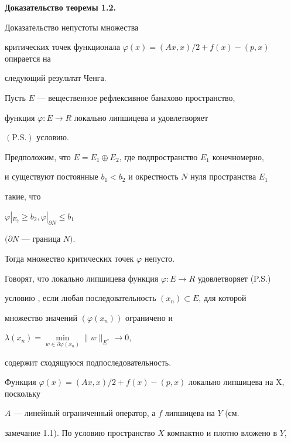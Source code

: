\medskip





{\bf Доказательство теоремы 1.2.}


Доказательство непустоты множества


критических точек функционала $\varphi(x)=(Ax,x)/2+f(x)-(p,x)$ опирается на


следующий результат Ченга.





\begin{thms}


Пусть $E$ --- вещественное рефлексивное банахово пространство,


функция $\varphi :E\to R$ локально липшицева и удовлетворяет


$\mathrm{(P.S.)}$ условию.


Предположим, что $E=E_1\oplus E_2$, где подпространство $E_1$ конечномерно,


и существуют постоянные $b_1<b_2$ и окрестность $N$ нуля пространства $E_1$


такие, что


$\varphi|_{E_2}\ge b_2,\varphi|_{\partial N}\le b_1$


$(\partial N$ --- граница $N)$.


Тогда множество критических точек $\varphi$ непусто.


\end{thms}





Говорят, что локально липшицева функция $\varphi:E\to R$ удовлетворяет (P.S.)


условию \cite{n9}, если любая последовательность $(x_n)\subset E$, для которой


множество значений $(\varphi(x_n))$ ограничено и


$\lambda(x_n)=\min\limits_{w\in\partial\varphi(x_n)}\|w\|_{E^*}\to 0$,


содержит сходящуюся подпоследовательность.





Функция $\varphi(x)=(Ax,x)/2+f(x)-(p,x)$ локально липшицева на X, поскольку


$A$ --- линейный ограниченный оператор, а $f$ липшицева на $Y$ (см.


замечание 1.1). По условию пространство $X$ компактно и плотно вложено в $Y$,


